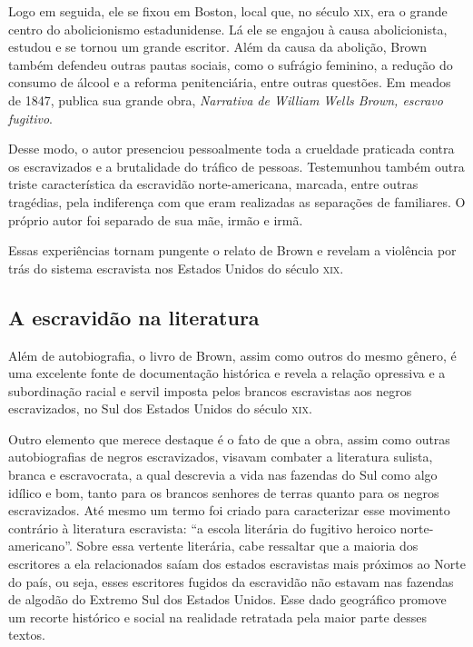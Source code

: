\documentclass[12pt]{extarticle}
\begin{document}
Logo em seguida, ele se fixou em Boston, local que, no século \textsc{xix}, era o
grande centro do abolicionismo estadunidense. Lá ele se engajou à causa
abolicionista, estudou e se tornou um grande escritor. Além da causa da
abolição, Brown também defendeu outras pautas sociais, como o sufrágio
feminino, a redução do consumo de álcool e a reforma penitenciária,
entre outras questões. Em meados de 1847, publica sua grande obra,
\emph{Narrativa de William Wells Brown, escravo fugitivo}.

Desse modo, o autor presenciou pessoalmente toda a crueldade praticada
contra os escravizados e a brutalidade do tráfico de pessoas.
Testemunhou também outra triste característica da escravidão
norte-americana, marcada, entre outras tragédias, pela indiferença com
que eram realizadas as separações de familiares. O próprio autor foi
separado de sua mãe, irmão e irmã.

Essas experiências tornam pungente o relato de Brown e revelam a
violência por trás do sistema escravista nos Estados Unidos do século
\textsc{xix}.


\subsection{A escravidão na literatura}

Além de autobiografia, o livro de Brown, assim como outros do mesmo
gênero, é uma excelente fonte de documentação histórica e revela a
relação opressiva e a subordinação racial e servil imposta pelos brancos
escravistas aos negros escravizados, no Sul dos Estados Unidos do século
\textsc{xix}.

Outro elemento que merece destaque é o fato de que a obra, assim como
outras autobiografias de negros escravizados, visavam combater a
literatura sulista, branca e escravocrata, a qual descrevia a vida nas
fazendas do Sul como algo idílico e bom, tanto para os brancos senhores
de terras quanto para os negros escravizados. Até mesmo um termo foi
criado para caracterizar esse movimento contrário à literatura
escravista: ``a escola literária do fugitivo heroico norte-americano''.
Sobre essa vertente literária, cabe ressaltar que a maioria dos
escritores a ela relacionados saíam dos estados escravistas mais
próximos ao Norte do país, ou seja, esses escritores fugidos da
escravidão não estavam nas fazendas de algodão do Extremo Sul dos
Estados Unidos. Esse dado geográfico promove um recorte histórico e
social na realidade retratada pela maior parte desses textos.
\end{document}
